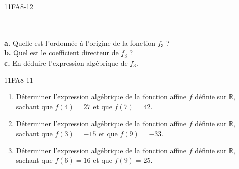 \documentclass[a4paper,12pt]{report}
\begin{document}
\begin{EXO}{}{11FA8-12}
\begin{enumerate}[]
\begin{tikzpicture}[baseline,scale = 0.5]
\end{tikzpicture}\\\\\textbf {a.} Quelle est l'ordonnée à l'origine de la fonction $f_3$ ?\\\textbf {b.} Quel est le coefficient directeur de $f_3$ ?\\\textbf {c.} En déduire l'expression algébrique de $f_3$.
\end{enumerate}
\end{EXO}

\begin{EXO}{}{11FA8-11}


\begin{enumerate}[]
	\item  Déterminer l'expression algébrique de la fonction affine $f$ définie sur $\mathbb R$, sachant que
                        $f(4)=27$ et que $f(7)=42$.\\
	\item  Déterminer l'expression algébrique de la fonction affine $f$ définie sur $\mathbb R$, sachant que
                        $f(3)=-15$ et que $f(9)=-33$.\\
	\item  Déterminer l'expression algébrique de la fonction affine $f$ définie sur $\mathbb R$, sachant que
                        $f(6)=16$ et que $f(9)=25$.\\
\end{enumerate}
\end{EXO}
\end{document}
